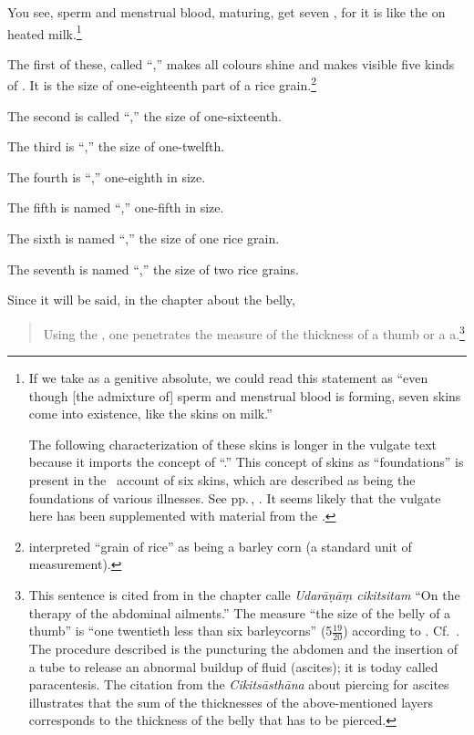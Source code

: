 \begin{translation}
\item[4]

You see, sperm and menstrual blood, maturing, get seven
, for it is like the  on heated
milk.\footnote{If we take  as a
    genitive absolute, we could read this statement as “even though [the
    admixture of] sperm and menstrual blood is forming, seven skins come
    into existence, like the skins on milk.”
    
 The following characterization of these skins is longer in the
vulgate text because it imports the concept of
“.”  This concept of skins as
“foundations” is present in the \CS\ account of six skins, which are
described as being the foundations of various illnesses. See
pp.\,\pageref{ka4:kalā}, \pageref{sa4:kalā}.  It seems likely that
the vulgate here has been supplemented with material from the \CS.}

The first  of these, called  “,”  makes all
colours shine and makes  visible five kinds of .
It is the size of one-eighteenth part of a rice
grain.\footnote{ interpreted  “grain of
    rice” as being a barley corn (a standard unit of measurement).}

The second is called “,” the size of one-sixteenth.
  
The third is “,” the size of one-twelfth. 
 
The fourth is “,” one-eighth in size. 
 
The fifth is named “,” one-fifth in size. 
 
The sixth is named “,” the size of one rice grain.

The seventh is named  “,”  the size of
two rice grains.
 
Since it will be said, in the chapter about the belly, 
\begin{quote}
     Using the , one penetrates
the measure of the thickness of a thumb or a a.\footnote{This sentence is cited from 
    in the chapter calle \emph{Udarāṇāṃ cikitsitam} “On the therapy
    of the abdominal ailments.”  The measure
     “the size of the belly of a thumb” is
     “one twentieth less than
    six barleycorns” (5$\frac{19}{20}$) according to
    . Cf.\ \cite[10]{josi-maha}.  The procedure
    described is the puncturing the abdomen and the insertion of a
    tube to release an abnormal buildup of fluid (ascites); it is
    today called paracentesis.  The citation from the
    \emph{Cikitsāsthāna} about piercing for ascites illustrates that
    the sum of the thicknesses of the above-mentioned layers
    corresponds to the thickness of the belly that has to be pierced.
    
}
\end{quote}
\end{translation}
